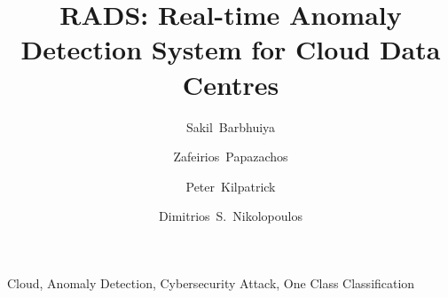 \documentclass[preprint]{elsarticle}
\begin{document}
\begin{frontmatter}


\title{RADS: Real-time Anomaly Detection System for Cloud Data Centres}



\author[1]{Sakil~Barbhuiya}

\author[1]{Zafeirios~Papazachos}

\author[1]{Peter~Kilpatrick}

\author[2]{Dimitrios~S.~Nikolopoulos}

\address[1]{Queen's University Belfast, United Kingdom}
\address[2]{Virginia Tech, United States\\ }


\begin{abstract}

\end{abstract}

\begin{keyword}
Cloud, Anomaly Detection, Cybersecurity Attack, One Class Classification
\end{keyword}

\end{frontmatter}










\end{document}
